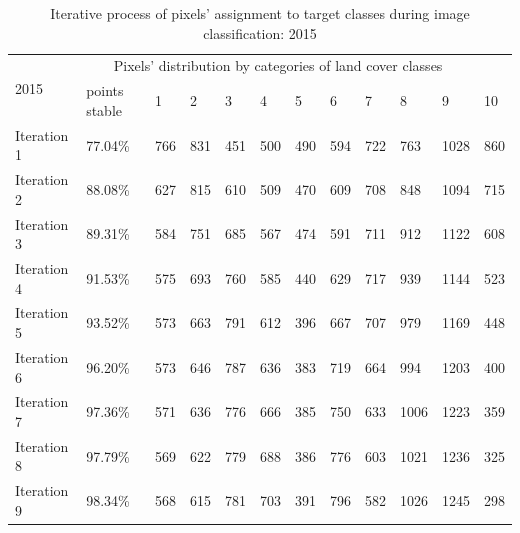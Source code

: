 \documentclass[jmse,article,submit,pdftex,moreauthors]{Definitions/mdpi}
\begin{document}
\begin{table}[H]
  \centering
  \begin{tabularx}{\textwidth}{p{1.6cm}p{1.8cm}p{0.6cm}p{0.6cm}p{0.6cm}p{0.6cm}p{0.6cm}p{0.6cm}p{0.6cm}p{0.6cm}p{0.6cm}p{0.6cm}}
  \toprule
  \multirow{2}{*}{2015} & \multicolumn{10}{c}{Pixels' distribution by categories of land cover classes} \\
      & points stable & 1 & 2 &  3 & 4 & 5 & 6 & 7 & 8 & 9 & 10 \\
    \midrule
    Iteration 1 & 77.04\% & 766  & 831  &451& 500  &490 &594  &722 &763 &1028 & 860 \\
    Iteration 2 & 88.08\% & 627 & 815 &610 & 509 &470& 609 &708 &848 &1094&715 \\
    Iteration 3 & 89.31\% & 584 & 751& 685 & 567 & 474& 591 &711 &912&1122 &608 \\
    Iteration 4 & 91.53\% & 575  & 693&760&585 & 440& 629 & 717 & 939& 1144 &523 \\
    Iteration 5 & 93.52\% & 573 & 663 & 791 & 612  &396 & 667 & 707 & 979&1169 &448 \\
    Iteration 6 & 96.20\% & 573 & 646 & 787 & 636 &383 &719 &664 &994 & 1203 & 400 \\
    Iteration 7 & 97.36\% & 571 & 636 &776 & 666 &385& 750 & 633  &1006 &1223 &359 \\
    Iteration 8 & 97.79\% & 569 & 622 &779 & 688 &386 &776 &603&1021&1236&325\\
    Iteration 9 & 98.34\% & 568& 615 &781&703  &391&796&582& 1026&1245&298 \\
\bottomrule
\end{tabularx}
  \caption{Iterative process of pixels' assignment to target classes during image classification: 2015}
  \label{tabB2}
\end{table}
\end{document}
